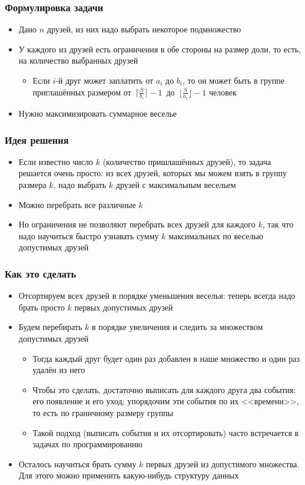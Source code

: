 \begin{frame}
  \frametitle{Формулировка задачи}
  \begin{itemize}
    \item Дано $n$ друзей, из них надо выбрать некоторое подмножество
    \item У каждого из друзей есть ограничения в обе стороны на размер доли, то есть, на количество выбранных друзей
      \begin{itemize}
        \item Если $i$-й друг может заплатить от $a_i$ до $b_i$, то он может быть в группе приглашённых размером
              от~$\lceil\frac{S}{b_i}\rceil-1$~до~$\lfloor\frac{S}{a_i}\rfloor-1$ человек
      \end{itemize}
    \item Нужно максимизировать суммарное веселье
  \end{itemize}
\end{frame}

\begin{frame}
  \frametitle{Идея решения}
  \begin{itemize}
    \item Если известно число $k$ (количество пришлашённых друзей), то задача решается очень просто: из всех друзей,
          которых мы можем взять в группу размера $k$, надо выбрать $k$ друзей с максимальным весельем
    \item Можно перебрать все различные $k$
    \item Но ограничения не позволяют перебрать всех друзей для каждого $k$, так что надо научиться быстро узнавать
          сумму $k$ максимальных по веселью допустимых друзей
  \end{itemize}
\end{frame}

\begin{frame}
  \frametitle{Как это сделать}
  \begin{itemize}
    \item Отсортируем всех друзей в порядке уменьшения веселья: теперь всегда надо брать просто $k$ первых допустимых друзей
    \item Будем перебирать $k$ в порядке увеличения и следить за множеством допустимых друзей
      \begin{itemize}
        \item Тогда каждый друг будет один раз добавлен в наше множество и один раз удалён из него
        \item Чтобы это сделать, достаточно выписать для каждого друга два события: его появление и его уход; упорядочим эти
              события по их <<времени>>, то есть по граничному размеру группы
        \item Такой подход (выписать события и их отсортировать) часто встречается в задачах по программированию
      \end{itemize}
    \item Осталось научиться брать сумму $k$ первых друзей из допустимого множества. 
    Для этого можно применить какую-нибудь структуру данных
  \end{itemize}
\end{frame}

